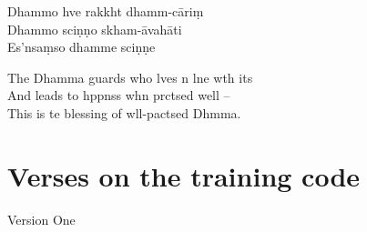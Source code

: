 Dhammo hve rakkht dhamm-cāriṃ\\
Dhammo sciṇṇo skham-āvahāti\\
Es'nsaṃso dhamme sciṇṇe

\begin{english}
  The Dhamma guards who lves n lne wth its\\
  And leads to hppnss whn prctsed well --\\
  This is te blessing of wll-pactsed Dhmma.
\end{english}

\chapter{Verses on the training code}%

\begin{leader}
\end{leader}

\begin{instruction}
  Version One
\end{instruction}

